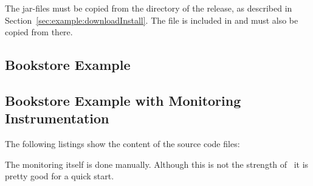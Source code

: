 \vspace{1ex}
\vspace{1ex}

The \Kieker{} jar-files must be copied from the  directory %
of the \Kieker{} release, as described in Section~\ref{sec:example:downloadInstall}. %
The file  is included in  %
and must also be copied from there.


\subsection{Bookstore Example}

\subsection{Bookstore Example with Monitoring Instrumentation}

The following listings show the content of the source code files:
\setJavaCodeListing       






		The monitoring itself is done manually. Although this is not the strength of \Kieker\ it is pretty good for a quick start. 

